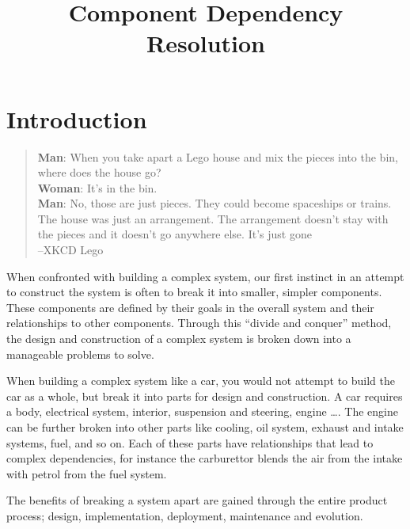 \documentclass{report}
\title{Component Dependency Resolution}
\begin{document}
\chapter{Introduction}


\begin{quotation}
\textbf{Man}: When you take apart a Lego house and mix the pieces into the bin, where does the house go?\\
\textbf{Woman}: It's in the bin.\\
\textbf{Man}: No, those are just pieces. They could become spaceships or trains. 
The house was just an arrangement. The arrangement doesn't stay with the pieces and it doesn't go anywhere else. It's just gone\\
--XKCD Lego
\end{quotation}

{}When confronted with building a complex system, our first instinct in an attempt to construct the system is often to break it into smaller, simpler components. 
{}These components are defined by their goals in the overall system and their relationships to other components.
{}Through this ``divide and conquer'' method, the design and construction of a complex system is broken down into a manageable problems to solve.

When building a complex system like a car, you would not attempt to build the car as a whole, but break it into parts for design and construction.
A car requires a body, electrical system, interior, suspension and steering, engine \ldots. 
The engine can be further broken into other parts like cooling, oil system, exhaust and intake systems, fuel, and so on.
Each of these parts have relationships that lead to complex dependencies, for instance the carburettor blends the air from the intake with petrol from the fuel system.

The benefits of breaking a system apart are gained through the entire product process; design, implementation, deployment, maintenance and evolution.

\end{document}
